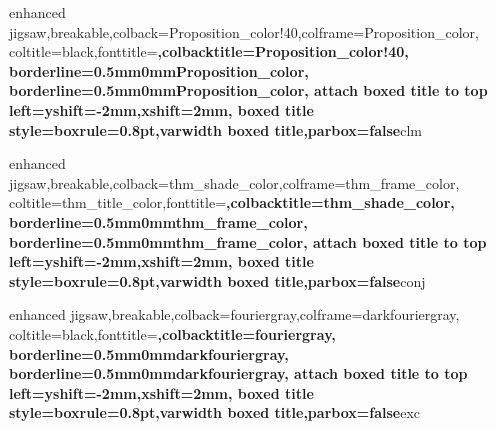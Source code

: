 {enhanced jigsaw,breakable,colback=Proposition_color!40,colframe=Proposition_color,
coltitle=black,fonttitle=\bfseries ,colbacktitle=Proposition_color!40,
borderline={0.5mm}{0mm}{Proposition_color},
borderline={0.5mm}{0mm}{Proposition_color},
attach boxed title to top left={yshift=-2mm,xshift=2mm},
boxed title style={boxrule=0.8pt},varwidth boxed title,parbox=false}{clm}


{enhanced jigsaw,breakable,colback=thm_shade_color,colframe=thm_frame_color,
coltitle=thm_title_color,fonttitle=\bfseries ,colbacktitle=thm_shade_color,
borderline={0.5mm}{0mm}{thm_frame_color},
borderline={0.5mm}{0mm}{thm_frame_color},
attach boxed title to top left={yshift=-2mm,xshift=2mm},
boxed title style={boxrule=0.8pt},varwidth boxed title,parbox=false}{conj}

{enhanced jigsaw,breakable,colback=fouriergray,colframe=darkfouriergray,
coltitle=black,fonttitle=\bfseries ,colbacktitle=fouriergray,
borderline={0.5mm}{0mm}{darkfouriergray},
borderline={0.5mm}{0mm}{darkfouriergray},
attach boxed title to top left={yshift=-2mm,xshift=2mm},
boxed title style={boxrule=0.8pt},varwidth boxed title,parbox=false}{exc}

\renewcommand*\proofname{Beweis}
\makeatletter
\newenvironment{beweis}[1][\proofname]{
	\par
	\pushQED{\qed}%
	\normalfont \topsep6\p@\@plus6\p@\relax
	\trivlist
	\item[\hskip\labelsep
		\bfseries #1\@addpunct{:}]~\newline\ignorespaces
}{
	\popQED\endtrivlist\@endpefalse
	\noindent\ignorespacesafterend
}
\newenvironment{pwoof}[1][\proofname]{
	\par
	\pushQED{\qed}%
	\normalfont \topsep6\p@\@plus6\p@\relax
	\trivlist
	\item[\hskip\labelsep
		\bfseries #1\@addpunct{:}]~\newline\ignorespaces
}{
	\popQED\endtrivlist\@endpefalse
	\noindent\ignorespacesafterend
}
\makeatother



\newsavebox{\informationbox}
\newenvironment{information}
{\begin{center}\begin{lrbox}{\informationbox}\begin{minipage}{0.8\textwidth}\small}
{\end{minipage}\end{lrbox}
\begin{tikzpicture}
\draw[fill] (-0.5*\wd\informationbox - 1cm, - 0.3cm) ellipse (0.3cm and 0.15cm);
\shadedraw[ball color=white] (-0.5*\wd\informationbox -  1cm, 0cm) circle (0.3cm);
\draw[color=black] (-0.5*\wd\informationbox - 1cm + 0.01cm, 0cm) node {\rotatebox{10}{\bfseries i}};

\draw (0,0) node {\usebox{\informationbox}};
\end{tikzpicture}\end{center}
}

